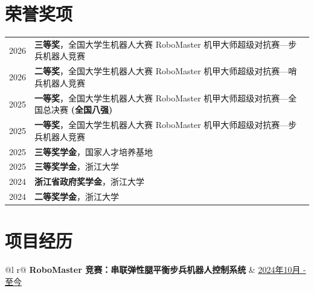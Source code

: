 \documentclass[a4paper,12pt]{article}
\begin{document}
\section{荣誉奖项}
\begin{tabularx}{\linewidth}{@{}l X@{}}
2026 & \textbf{三等奖}，全国大学生机器人大赛 RoboMaster 机甲大师超级对抗赛—步兵机器人竞赛 \\[3.75pt]
2026 & \textbf{二等奖}，全国大学生机器人大赛 RoboMaster 机甲大师超级对抗赛—哨兵机器人竞赛 \\[3.75pt]
2025 & \textbf{一等奖}，全国大学生机器人大赛 RoboMaster 机甲大师超级对抗赛—全国总决赛 \textbf{(全国八强)} \\[3.75pt]
2025 & \textbf{一等奖}，全国大学生机器人大赛 RoboMaster 机甲大师超级对抗赛—步兵机器人竞赛 \\[3.75pt]
2025 & \textbf{三等奖学金}，国家人才培养基地 \\[3.75pt]
2025 & \textbf{三等奖学金}，浙江大学 \\[3.75pt]
2024 & \textbf{浙江省政府奖学金}，浙江大学 \\[3.75pt]
2024 & \textbf{二等奖学金}，浙江大学 \\
\end{tabularx}

\section{项目经历}

\begin{tabularx}{\linewidth}{ @{}l r@{} }
\textbf{RoboMaster 竞赛：串联弹性腿平衡步兵机器人控制系统} & \hfill \href{https://Particlela.github.io/project/}{2024年10月 - 至今} \\[3.75pt]
  \\
\end{tabularx}
\end{document}
